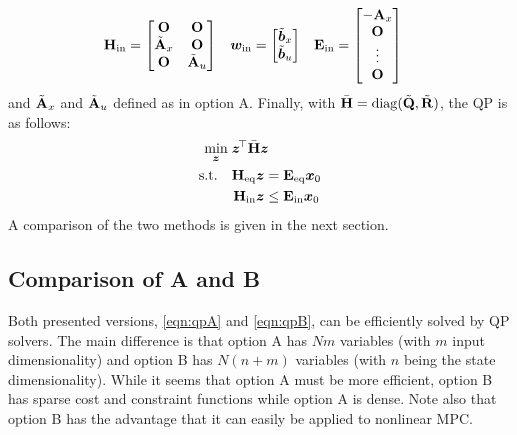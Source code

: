 			\begin{align}
				\bm{\mathrm{H}}_\mathrm{in} &=
					\begin{bmatrix}
						\bm{\mathrm{O}}           & \bm{\mathrm{O}}           \\
						\tilde{\bm{\mathrm{A}}}_x & \bm{\mathrm{O}}           \\
						\bm{\mathrm{O}}           & \tilde{\bm{\mathrm{A}}}_u
					\end{bmatrix} &
				\bm{w}_\mathrm{in} &=
					\begin{bmatrix}
						\tilde{\bm{b}}_x \\
						\tilde{\bm{b}}_u
					\end{bmatrix} &
				\bm{\mathrm{E}}_\mathrm{in} &=
					\begin{bmatrix}
						-\bm{\mathrm{A}}_x \\
						\bm{\mathrm{O}}    \\
						\vdots     \\
						\bm{\mathrm{O}}
					\end{bmatrix}
			\end{align}
			and \(\tilde{\bm{\mathrm{A}}}_x\) and \(\tilde{\bm{\mathrm{A}}}_u\) defined as in option A. Finally, with \( \bar{\bm{\mathrm{H}}} = \operatorname{diag}(\tilde{\bm{\mathrm{Q}}}, \tilde{\bm{\mathrm{R}}}) \), the QP is as follows:
			\begin{equation}
				\begin{aligned}
					\min_{\bm{z}}\; & \bm{z}^{\!\top} \bar{\bm{\mathrm{H}}} \bm{z} \\
					\text{s.t.}\quad &
						\begin{aligned}[t]
							\bm{\mathrm{H}}_\mathrm{eq} \bm{z} &= \bm{\mathrm{E}}_\mathrm{eq} \bm{x}_0 \\
							\bm{\mathrm{H}}_\mathrm{in} \bm{z} &\leq \bm{\mathrm{E}}_\mathrm{in} \bm{x}_0
						\end{aligned}
				\end{aligned}
				\label{eqn:qpB}
			\end{equation}
			A comparison of the two methods is given in the next section.

		\subsection{Comparison of A and B}
			Both presented versions, \eqref{eqn:qpA} and \eqref{eqn:qpB}, can be efficiently solved by QP solvers. The main difference is that option A has \(Nm\) variables (with \(m\) input dimensionality) and option B has \(N (n + m)\) variables (with \(n\) being the state dimensionality). While it seems that option A must be more efficient, option B has sparse cost and constraint functions while option A is dense. Note also that option B has the advantage that it can easily be applied to nonlinear MPC.

